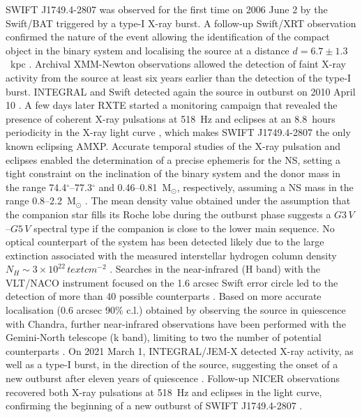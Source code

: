 \documentclass[fleqn,usenatbib]{mnras}
\newcommand{\swiftj}{SWIFT J1749.4-2807}
\newcommand{\nicer}{NICER}
\newcommand{\xmm}{XMM-Newton}
\newcommand{\rxte}{RXTE}
\newcommand{\chandra}{Chandra}
\newcommand{\swift}{Swift}
\newcommand{\inte}{INTEGRAL}
\begin{document}
\swiftj{} was observed for the first time on 2006 June 2 by the \swift{}/BAT \citep{Schady2006} triggered by a type-I X-ray burst. A follow-up \swift{}/XRT observation confirmed the nature of the event allowing the identification of the compact object in the binary system and localising the source at a distance $d=6.7\pm1.3$~kpc \citep[][]{Wijnands:2009wa,Campana:2009va}. Archival \xmm{} observations allowed the detection of faint X-ray activity from the source at least six years earlier than the detection of the type-I burst. 
\inte{} and \swift{} detected again the source in outburst on 2010 April 10 \citep{Pavan2010,Chenevez2010}. A few days later \rxte{} started a monitoring campaign that revealed the presence of coherent X-ray pulsations at 518~Hz \citep{Altamirano2010} and eclipses at an 8.8~hours periodicity in the X-ray light curve \citep{Markwardt2010}, which makes \swiftj{} the only known eclipsing AMXP. Accurate temporal studies of the X-ray pulsation and eclipses enabled the determination of a precise ephemeris for the NS, setting a tight constraint on the inclination of the binary system and the donor mass in the range 74.4$^\circ$--77.3$^\circ$ and 0.46--0.81~M$_\odot$, respectively, assuming a NS mass in the range 0.8--2.2~M$_\odot$ \citep[][]{Markwardt:2010tl,Altamirano:2011uq}. The mean density value obtained under the assumption that the companion star fills its Roche lobe during the outburst phase suggests a $G3\,V$--$G5\,V$ spectral type if the companion is close to the lower main sequence. No optical counterpart of the system has been detected likely due to the large extinction associated with the measured interstellar hydrogen column density $N_H\sim3 \times 10^{22}\,text{cm}^{-2}$ \citep{Ferrigno:2011wz}. Searches in the near-infrared (H band) with the VLT/NACO instrument focused on the 1.6 arcsec \swift{} error circle led to the detection of more than 40 possible counterparts \citep{DAvanzo:2011tq}. Based on more accurate localisation (0.6 arcsec 90\% c.l.) obtained by observing the source in quiescence with \chandra{}, further near-infrared observations have been performed with the Gemini-North telescope (k band), limiting to two the number of potential counterparts \citep{Jonker:2013wp}. 
On 2021 March 1, \inte{}/JEM-X detected X-ray activity, as well as a type-I burst, in the direction of the source, suggesting the onset of a new outburst after eleven years of quiescence \citep{Mereminskiy2021}. Follow-up \nicer{} observations recovered both X-ray pulsations at 518~Hz and eclipses in the light curve, confirming the beginning of a new outburst of \swiftj{} \citep{Bult:2021wk}.
\end{document}
